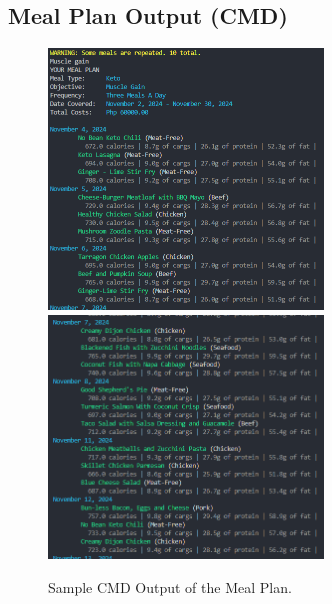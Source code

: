 \documentclass{article}
\begin{document}
\subsection{Meal Plan Output (CMD)}
\begin{figure}[!hbt]
  \begin{center}
    \includegraphics[width=0.65\textwidth]{docs/image-3.png}
    \includegraphics[width=0.65\textwidth]{docs/image-4.png}
    \caption{Sample CMD Output of the Meal Plan.}
  \end{center}
\end{figure}
\end{document}
